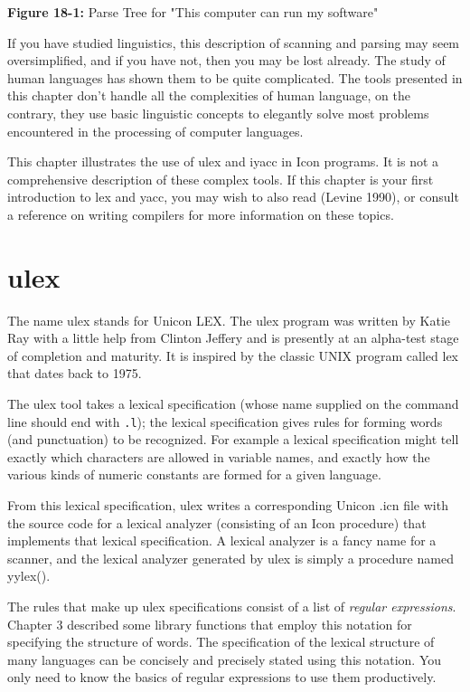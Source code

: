 {\sffamily\bfseries Figure 18-1:}
{\sffamily Parse Tree for "This computer can run my
software"}

\bigskip

If you have studied linguistics, this description of scanning and
parsing may seem oversimplified, and if you have not, then
you may be lost already.  The study of human languages has shown them
to be quite complicated.  The tools presented in this chapter
don't handle all the complexities of human language,
on the contrary, they use basic linguistic concepts to elegantly solve
most problems encountered in the processing of computer languages.

This chapter illustrates the use of \textsf{ulex} and
\textsf{iyacc} in Icon programs. It is not a comprehensive description
of these complex tools. If this chapter is your first introduction to
\textsf{lex} and \textsf{yacc}, you may wish to also read (Levine
1990), or consult a reference on writing compilers for more information
on these topics.

\section{\textsf{ulex}}

The name \textsf{ulex} stands for Unicon LEX. The \textsf{ulex}
program was written by Katie Ray with a little help from Clinton Jeffery
and is presently at an alpha-test stage of completion and maturity.
It is inspired by the classic UNIX program called \textsf{lex} that
dates back to 1975.

The \textsf{ulex} tool takes a lexical specification (whose
name supplied on the command line should end with \texttt{.l}); the lexical
specification gives rules for forming words (and punctuation) to
be recognized.  For example a lexical specification might tell exactly
which characters are allowed in variable names, and exactly how the
various kinds of numeric constants are formed for a given language.

From this lexical specification, \textsf{ulex} writes a corresponding Unicon
.icn file with the source code for a lexical analyzer (consisting of an Icon
procedure) that implements that lexical specification. A lexical analyzer is a fancy name for a scanner, and the lexical
analyzer generated by \textsf{ulex} is simply a procedure named
\textsf{yylex()}.

The rules that make up
\textsf{ulex} specifications consist of a list of {\em regular expressions\/}.
Chapter 3 described some library functions that employ  this notation for specifying the structure
of words. The specification of the lexical structure of many languages
can be concisely and precisely stated using this notation. You only
need to know the basics of regular expressions to use them productively.

